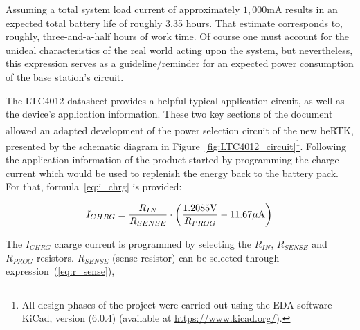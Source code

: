 \noindent Assuming a total system load current of approximately $1,000$mA results in an expected total battery life of roughly 3.35 hours. That estimate corresponds to, roughly, three-and-a-half hours of work time. Of course one must account for the unideal characteristics of the real world acting upon the system, but nevertheless, this expression serves as a guideline/reminder for an expected power consumption of the base station's circuit. 

The LTC4012 datasheet provides a helpful typical application circuit, as well as the device's application information. These two key sections of the document allowed an adapted development of the power selection circuit of the new beRTK\textsuperscript{\textregistered}, presented by the schematic diagram in Figure~\ref{fig:LTC4012_circuit}\footnote[7]{All design phases of the project were carried out using the EDA software KiCad, version (6.0.4) (available at \url{https://www.kicad.org/}).}. Following the application information of the product started by programming the charge current which would be used to replenish the energy back to the battery pack. For that, formula~\ref{eq:i_chrg} is provided:

\begin{equation}\label{eq:i_chrg}
    I_{CHRG}=\frac{R_{IN}}{R_{SENSE}} \cdot \left(\frac{1.2085\textrm{V}}{R_{PROG}}-11.67\mu\textrm{A}\right)\,\medskip
\end{equation}

\noindent The $I_{CHRG}$ charge current is programmed by selecting the $R_{IN}$, $R_{SENSE}$ and $R_{PROG}$ resistors. $R_{SENSE}$ (sense resistor) can be selected through expression~(\ref{eq:r_sense}),

